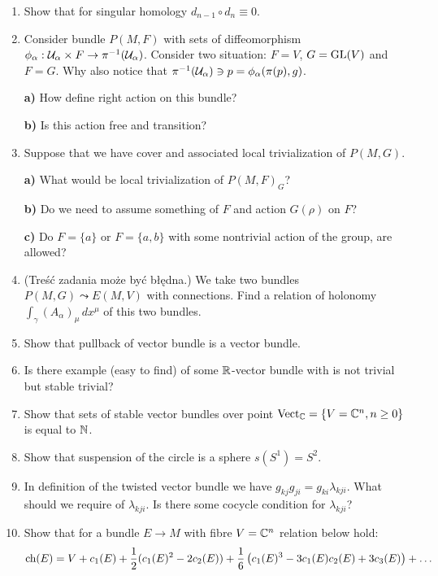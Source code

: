\documentclass[a4paper,11pt]{article}
\begin{document}
\begin{enumerate}
\item Show that for singular homology $d_{ n - 1 } \circ d_{ n } \equiv 0$.

\item Consider bundle $P( M, F )$ with sets of diffeomorphism
  $\phi_{ \alpha } : \mathcal{U}_{ \alpha } \times F \to \pi^{ -1 }( \mathcal{U}_{
    \alpha } )$. Consider two situation: $F = V$, $G = \mathrm{GL}( V )$ and
  $F = G$. Why also notice that
  $\pi^{ -1 }( \mathcal{U}_{ \alpha } ) \ni p = \phi_{ \alpha }( \pi( p ), g )$.

  \textbf{a)} How define right action on this bundle?

  \textbf{b)} Is this action free and transition?

\item Suppose that we have cover and associated local trivialization
  of $P( M, G )$.

  \textbf{a)} What would be local trivialization of $P( M, F )_{ G }$?

  \textbf{b)} Do we need to assume something of $F$ and action
  $G( \rho )$ on $F$?

  \textbf{c)} Do $F = \{ a \}$ or $F = \{ a, b \}$ with some nontrivial
  action of the group, are allowed?

\item (Treść zadania może być błędna.) We take two bundles
  $P( M, G ) \leadsto E( M, V )$ with connections. Find a relation of
  holonomy $\int_{ \gamma } ( A_{ \alpha } )_{ \mu } \, dx^{ \mu }$ of
  this two bundles.

\item Show that pullback of vector bundle is a vector bundle.

\item Is there example (easy to find) of some $\mathbb{R}$-vector bundle
  with is not trivial but stable trivial?

\item Show that sets of stable vector bundles over point
  $\textrm{Vect}_{ \mathbb{C} } = \{ V = \mathbb{C}^{ n }, n \geq 0 \}$ is equal to $\mathbb{N}$.

\item Show that suspension of the circle is a sphere
  $s( S^{ 1 } ) = S^{ 2 }$.

\item In definition of the twisted vector bundle we have
  $g_{ kj } g_{ ji } = g_{ ki } \lambda_{ kji }$. What should we
  require of $\lambda_{ kji }$. Is there some cocycle condition for
  $\lambda_{ kji }$?

\item Show that for a bundle $E \to M$ with fibre $V = \mathbb{C}^{ n }$
  relation below hold:
  \begin{equation}
    \label{eq:DiffGeo-11}
    \textrm{ch}( E ) =
    V + c_{ 1 }( E )
    + \frac{ 1 }{ 2 } ( c_{ 1 }( E )^{ 2 } - 2 c_{ 2 }( E ) )
    + \frac{ 1 }{ 6 } \left( c_{ 1 }( E )^{ 3 } - 3 c_{ 1 }( E ) c_{ 2 }( E )
      + 3 c_{ 3 }( E ) \right) + \ldots
  \end{equation}


\end{enumerate}
\end{document}
